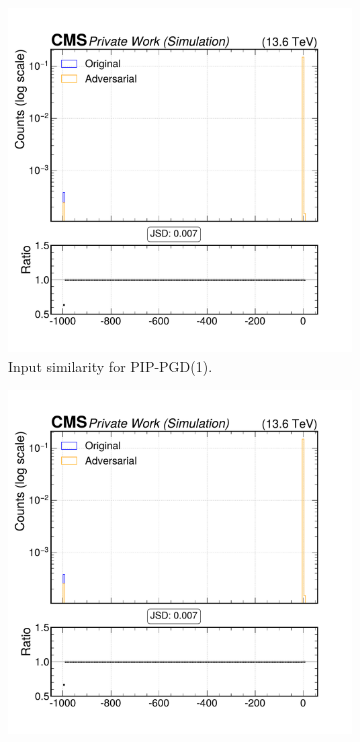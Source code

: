 \begin{figure}[htbp]
  \centering
  \begin{subfigure}[t]{0.32\textwidth}
    \includegraphics[width=\linewidth]{media/output/features/compare/combined_it_1/cmp_global_features_TagVarCSV_trackSumJetDeltaR.pdf}
    \caption*{Input similarity for PIP-PGD(1).}
  \end{subfigure}\hfill
  \begin{subfigure}[t]{0.32\textwidth}
    \includegraphics[width=\linewidth]{media/output/features/compare/combined_it_2/cmp_global_features_TagVarCSV_trackSumJetDeltaR.pdf}

\end{subfigure}
\end{figure}
